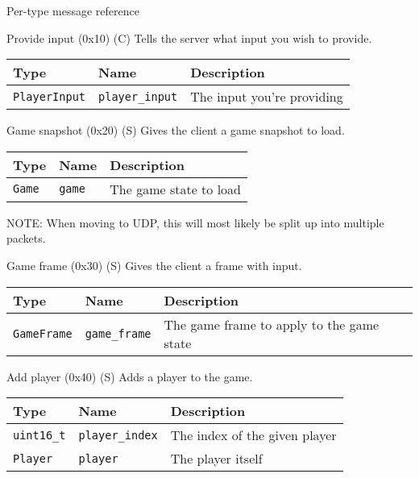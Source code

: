 \documentclass[a4paper,draft]{article}
\begin{document}
\begin{section}{Per-type message reference}
  \begin{subsection}{Provide input (0x10) (C)}
    Tells the server what input you wish to provide.

    \begin{tabular}{lll}
      \hline
      Type & Name & Description \\
      \hline
      \texttt{PlayerInput} & \texttt{player\_input} & The input you're providing \\
      \hline
    \end{tabular}
  \end{subsection}

  \begin{subsection}{Game snapshot (0x20) (S)}
    Gives the client a game snapshot to load.

    \begin{tabular}{lll}
      \hline
      Type & Name & Description \\
      \hline
      \texttt{Game} & \texttt{game} & The game state to load\\
      \hline
    \end{tabular}

    NOTE: When moving to UDP, this will most likely be split up into multiple packets.
  \end{subsection}

  \begin{subsection}{Game frame (0x30) (S)}
    Gives the client a frame with input.

    \begin{tabular}{lll}
      \hline
      Type & Name & Description \\
      \hline
      \texttt{GameFrame} & \texttt{game\_frame} & The game frame to apply to the game state \\
      \hline
    \end{tabular}
  \end{subsection}

  \begin{subsection}{Add player (0x40) (S)}
    Adds a player to the game.

    \begin{tabular}{lll}
      \hline
      Type & Name & Description \\
      \hline
      \texttt{uint16_t} & \texttt{player\_index} & The index of the given player \\
      \texttt{Player} & \texttt{player} & The player itself \\
      \hline
    \end{tabular}
  \end{subsection}
\end{section}
\end{document}
